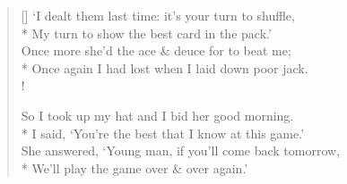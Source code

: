 \documentclass[MAIN]{subfiles}
\begin{document}
\begin{verse}[\versewidth]
`I dealt them last time: it's your turn to shuffle,\\*
\vin My turn to show the best card in the pack.'\\
Once more she'd the ace \& deuce for to beat me;\\*
\vin Once again I had lost when I laid down poor jack.\\!

So I took up my hat and I bid her good morning.\\*
\vin I said, `You're the best that I know at this game.'\\
She answered, `Young man, if you'll come back tomorrow,\\*
\vin We'll play the game over \& over again.'
\end{verse}
\end{document}
